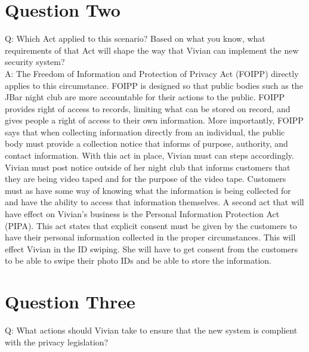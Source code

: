 \documentclass[paper=a4, fontsize=11pt]{scrartcl} %
\numberwithin{equation}{section} %
\numberwithin{figure}{section} %
\numberwithin{table}{section} %
\begin{document}

\section{Question Two}

Q: Which Act applied to this scenario? Based on what you know, what requirements of that Act will shape the way that Vivian can implement the new
security system?\\

A: The Freedom of Information and Protection of Privacy Act (FOIPP) directly applies to this circumstance. FOIPP is designed so that public bodies
such as the JBar night club are more accountable for their actions to the public. FOIPP provides right of access to records, limiting what can
be stored on record, and gives people a right of access to their own information. More importantly, FOIPP says that when collecting information
directly from an individual, the public body must provide a collection notice that informs of purpose, authority, and contact information. With this
act in place, Vivian must can steps accordingly. Vivian must post notice outside of her night club that informs customers that they are being video
taped and for the purpose of the video tape. Customers must as have some way of knowing what the information is being collected for and have the
ability to access that information themselves. A second act that will have effect on Vivian's business is the Personal Information Protection Act
(PIPA). This act states that explicit consent must be given by the customers to have their personal information collected in the proper circumstances.
This will effect Vivian in the ID swiping. She will have to get consent from the customers to be able to swipe their photo IDs and be able to 
store the information.


\section{Question Three}

Q: What actions should Vivian take to ensure that the new system is complient with the privacy legislation?\\
\end{document}
